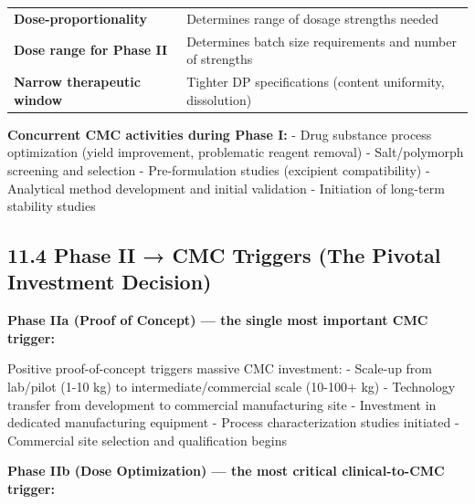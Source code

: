 \documentclass[
  11pt,
  a4paper,
]{report}
\begin{document}
\begin{longtable}[]{@{}ll@{}}
\begin{minipage}[t]{0.39\columnwidth}
\textbf{Dose-proportionality}\strut
\end{minipage} & \begin{minipage}[t]{0.55\columnwidth}\raggedright
Determines range of dosage strengths needed\strut
\end{minipage}\tabularnewline
\begin{minipage}[t]{0.39\columnwidth}\raggedright
\textbf{Dose range for Phase II}\strut
\end{minipage} & \begin{minipage}[t]{0.55\columnwidth}\raggedright
Determines batch size requirements and number of strengths\strut
\end{minipage}\tabularnewline
\begin{minipage}[t]{0.39\columnwidth}\raggedright
\textbf{Narrow therapeutic window}\strut
\end{minipage} & \begin{minipage}[t]{0.55\columnwidth}\raggedright
Tighter DP specifications (content uniformity, dissolution)\strut
\end{minipage}\tabularnewline
\bottomrule
\end{longtable}

\textbf{Concurrent CMC activities during Phase I:} - Drug substance
process optimization (yield improvement, problematic reagent removal) -
Salt/polymorph screening and selection - Pre-formulation studies
(excipient compatibility) - Analytical method development and initial
validation - Initiation of long-term stability studies

\hypertarget{phase-ii-cmc-triggers-the-pivotal-investment-decision}{%
\subsection{11.4 Phase II → CMC Triggers (The Pivotal Investment
Decision)}\label{phase-ii-cmc-triggers-the-pivotal-investment-decision}}

\textbf{Phase IIa (Proof of Concept) --- the single most important CMC
trigger:}

Positive proof-of-concept triggers massive CMC investment: - Scale-up
from lab/pilot (1-10 kg) to intermediate/commercial scale (10-100+ kg) -
Technology transfer from development to commercial manufacturing site -
Investment in dedicated manufacturing equipment - Process
characterization studies initiated - Commercial site selection and
qualification begins

\textbf{Phase IIb (Dose Optimization) --- the most critical
clinical-to-CMC trigger:}
\end{document}
